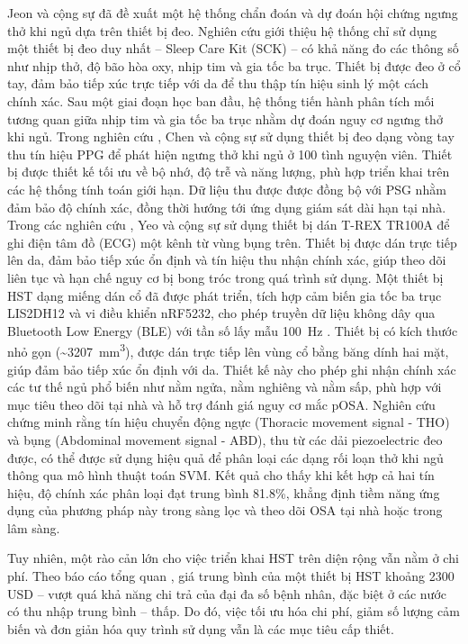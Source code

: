 Jeon và cộng sự \cite{jeon2020realtime} đã đề xuất một hệ thống chẩn đoán và 
dự đoán hội chứng ngưng thở khi ngủ dựa trên thiết bị đeo. 
Nghiên cứu giới thiệu hệ thống chỉ sử dụng một thiết bị đeo duy nhất – Sleep Care Kit (SCK) – 
có khả năng đo các thông số như nhịp thở, độ bão hòa oxy, nhịp tim và gia tốc ba trục. 
Thiết bị được đeo ở cổ tay, đảm bảo tiếp xúc trực tiếp với da để thu thập tín hiệu sinh lý một cách chính xác. 
Sau một giai đoạn học ban đầu, hệ thống tiến hành phân tích mối tương quan giữa nhịp tim và gia tốc ba trục 
nhằm dự đoán nguy cơ ngưng thở khi ngủ.
Trong nghiên cứu \cite{chen2024hdc}, Chen và cộng sự sử dụng thiết bị đeo dạng 
vòng tay thu tín hiệu PPG để phát hiện ngưng thở khi ngủ ở 100 tình nguyện viên. 
Thiết bị được thiết kế tối ưu về bộ nhớ, độ trễ và năng lượng, phù hợp triển khai 
trên các hệ thống tính toán giới hạn. Dữ liệu thu được được đồng bộ với PSG 
nhằm đảm bảo độ chính xác, đồng thời hướng tới ứng dụng giám sát dài hạn tại nhà.
Trong các nghiên cứu \cite{yeo2022resnet, yeo2022respiratory}, Yeo và cộng sự sử dụng thiết bị dán T-REX TR100A 
để ghi điện tâm đồ (ECG) một kênh từ vùng bụng trên. Thiết bị được dán trực tiếp lên da, 
đảm bảo tiếp xúc ổn định và tín hiệu thu nhận chính xác, giúp theo dõi liên tục và 
hạn chế nguy cơ bị bong tróc trong quá trình sử dụng.
Một thiết bị HST dạng miếng dán cổ đã được phát triển, tích hợp cảm biến 
gia tốc ba trục LIS2DH12 và vi điều khiển nRF5232, 
cho phép truyền dữ liệu không dây qua Bluetooth Low Energy (BLE) 
với tần số lấy mẫu 100~Hz \cite{Sleep_Posture_Detection}. Thiết bị có kích thước nhỏ gọn 
(\textasciitilde3207~mm\textsuperscript{3}), được dán trực tiếp lên vùng 
cổ bằng băng dính hai mặt, giúp đảm bảo tiếp xúc ổn định với da. 
Thiết kế này cho phép ghi nhận chính xác các tư thế ngủ phổ biến như nằm ngửa, 
nằm nghiêng và nằm sấp, phù hợp với mục tiêu theo dõi tại nhà và hỗ trợ đánh giá nguy cơ mắc pOSA.
Nghiên cứu\cite{svmHSt2017} chứng minh rằng tín hiệu chuyển động ngực (Thoracic movement signal - THO) và bụng (Abdominal movement signal - ABD), 
thu từ các dải piezoelectric đeo được, có thể được sử dụng hiệu quả để phân loại các dạng rối loạn thở khi ngủ thông qua mô hình 
thuật toán SVM. Kết quả cho thấy khi kết hợp cả hai tín hiệu, độ chính xác phân loại đạt trung bình 81.8\%, 
khẳng định tiềm năng ứng dụng của phương pháp này trong sàng lọc và theo dõi OSA tại nhà hoặc trong lâm sàng.

Tuy nhiên, một rào cản lớn cho việc triển khai HST trên diện rộng vẫn 
nằm ở chi phí. Theo báo cáo tổng quan \cite{hst_review}, giá trung bình 
của một thiết bị HST khoảng 2300 USD – vượt quá khả năng chi trả của đại 
đa số bệnh nhân, đặc biệt ở các nước có thu nhập trung bình – thấp. 
Do đó, việc tối ưu hóa chi phí, giảm số lượng cảm biến và đơn giản hóa 
quy trình sử dụng vẫn là các mục tiêu cấp thiết.

